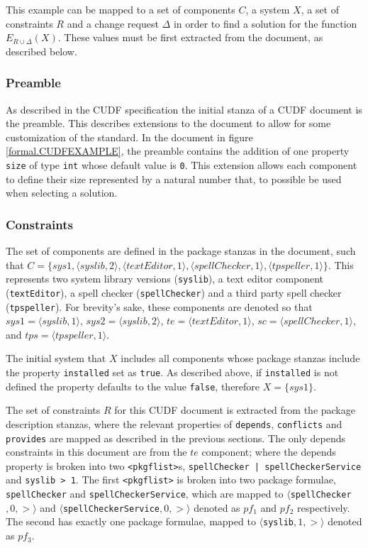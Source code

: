 This example can be mapped to a set of components $C$, a system $X$, a set of constraints $R$ and a change request $\Delta$ in order to find a solution for the function $E_{R \cup \Delta}(X)$.
These values must be first extracted from the document, as described below.

\subsubsection{Preamble}
As described in the CUDF specification the initial stanza of a CUDF document is the preamble.
This describes extensions to the document to allow for some customization of the standard. 
In the document in figure \ref{formal.CUDFEXAMPLE}, the preamble contains the addition of one property \verb+size+ of type \verb+int+ whose default value is \verb+0+.
This extension allows each component to define their size represented by a natural number that, to possible be used when selecting a solution.

\subsubsection{Constraints}

The set of components are defined in the package stanzas in the document,
such that $C = \{sys1, \langle syslib,2\rangle, \langle textEditor,1\rangle, \langle spellChecker,1\rangle, \langle tpspeller,1\rangle\}$.
This represents two system library versions (\verb+syslib+), a text editor component (\verb+textEditor+), a spell checker (\verb+spellChecker+) and a third party spell checker (\verb+tpspeller+).
For brevity's sake, these components are denoted so that $sys1 = \langle syslib,1\rangle$, $sys2 = \langle syslib,2\rangle$, $te = \langle textEditor,1\rangle$, $sc = \langle spellChecker,1\rangle$,
and $tps = \langle tpspeller,1\rangle$.

The initial system that $X$ includes all components whose package stanzas include the property \verb+installed+ set as \verb+true+.
As described above, if \verb+installed+ is not defined the property defaults to the value \verb+false+,
therefore $X = \{ sys1 \}$.

The set of constraints $R$ for this CUDF document is extracted from the package description stanzas, where the relevant properties of \verb+depends+, \verb+conflicts+ and \verb+provides+ are
mapped as described in the previous sections. 
The only depends constraints in this document are from the $te$ component;
where the depends property is broken into two \verb+<pkgflist>+s, \verb+spellChecker | spellCheckerService+ and \verb+syslib > 1+.
The first \verb+<pkgflist>+ is broken into two package formulae, \verb+spellChecker+  and \verb+spellCheckerService+,
which are mapped to $\langle $\verb+spellChecker+$,0,>\rangle$ and $\langle $\verb+spellCheckerService+$,0,>\rangle$ denoted as $pf_1$ and $pf_2$ respectively.
The second has exactly one package formulae, mapped to $\langle $\verb+syslib+$,1,>\rangle$ denoted as $pf_3$.

